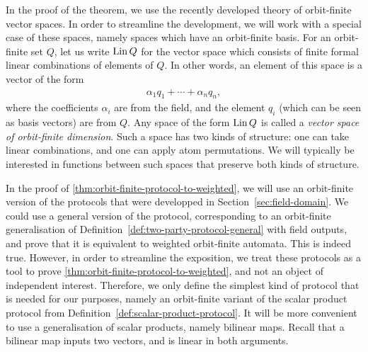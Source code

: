 In the proof of the theorem, we use the recently developed theory of orbit-finite vector spaces. In order to streamline the development, we will work with a special case of these spaces, namely spaces which have an orbit-finite basis.
For an orbit-finite set $Q$, let us write $\operatorname{Lin} Q$ for the vector space which consists of finite formal linear combinations of elements of $Q$. In other words, an element of this space is a vector of the form 
\begin{align*}
\alpha_1 q_1 + \cdots + \alpha_n q_n,
\end{align*}
where the coefficients $\alpha_i$ are from the field, and the element $q_i$ (which can be seen as basis vectors) are from $Q$. Any space of the form $\operatorname{Lin} Q$ is called a \emph{vector space of orbit-finite dimension}. Such a space has two kinds of structure: one can take linear combinations, and one can apply atom permutations. We will typically be interested in functions between such spaces that preserve both kinds of structure.

In the proof of \cref{thm:orbit-finite-protocol-to-weighted}, we will use an orbit-finite version of the protocols that were developped in Section~\ref{sec:field-domain}. We could use a general version of the protocol, corresponding to an orbit-finite generalisation of Definition~\ref{def:two-party-protocol-general} with field outputs, and prove that it is equivalent to weighted orbit-finite automata. This is indeed true.  However, in order to streamline the exposition, we treat these protocols as a tool to prove \cref{thm:orbit-finite-protocol-to-weighted}, and not an object of independent interest. Therefore, we only define the simplest kind of protocol that is needed for our purposes, namely an orbit-finite variant of the scalar product protocol from Definition~\ref{def:scalar-product-protocol}. It will be more convenient to use a generalisation of scalar products, namely bilinear maps. Recall that a bilinear map inputs two vectors, and is linear in both arguments. 




